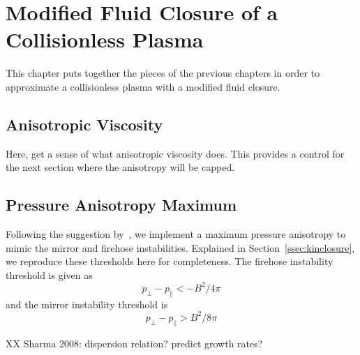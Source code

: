 \chapter{Modified Fluid Closure of a Collisionless Plasma}\label{chap:kinbrag}
This chapter puts together the pieces of the previous chapters in order to approximate a collisionless plasma with a modified fluid closure. 
\section{Anisotropic Viscosity}
Here, get a sense of what anisotropic viscosity does. This provides a control for the next section where the anisotropy will be capped.

\section{Pressure Anisotropy Maximum}
Following the suggestion by~\citet{Kunz2016}, we implement a maximum pressure anisotropy to mimic the mirror and firehose instabilities. Explained in Section~\ref{ssec:kinclosure}, we reproduce these thresholds here for completeness. The firehose instability threshold is given as
\begin{equation}
  p_\perp-p_\parallel<-B^2/4\pi
\end{equation}
and the mirror instability threshold is
\begin{equation}
  p_\perp-p_\parallel >B^2/8\pi \label{eq:mirrorthresh}
\end{equation}

XX Sharma 2008: dispersion relation? predict growth rates?


